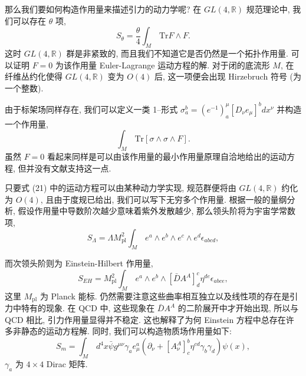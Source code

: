 \documentclass{article}
\begin{document}
那么我们要如何构造作用量来描述引力的动力学呢? 在 $GL(4,\mathbb{R})$ 规范理论中, 我们可以存在 $\theta$ 项,
\begin{equation}
S_{\theta}=\frac{\theta}{4}\int_{M}\,\text{Tr} F\wedge F.
\end{equation}
这时 $GL(4, \mathbb{R})$ 群是非紧致的, 而且我们不知道它是否仍然是一个拓扑作用量. 可以证明 $F=0$ 为该作用量 Euler-Lagrange 运动方程的解. 对于闭的底流形 $M$, 在纤维丛约化使得  $GL(4, \mathbb{R})$ 变为  $O(4)$ 后, 这一项便会出现 Hirzebruch 符号 (为一个整数).

由于标架场同样存在, 我们可以定义一类 1--形式 $\sigma_{a}^{b}=(e^{-1})_{a}^{\mu}[D_{\nu}e_{\mu}]^{b}dx^{\nu}$ 并构造一个作用量,
\begin{equation}
\int_{M}\,\textrm{Tr}[\sigma\wedge\sigma\wedge F].
\end{equation}
虽然 $F=0$ 看起来同样是可以由该作用量的最小作用量原理自洽地给出的运动方程, 但并没有文献支持这一点.

只要式 (21) 中的运动方程可以由某种动力学实现, 规范群便将由 $GL(4, \mathbb{R})$ 约化为 $O(4)$, 且由于度规已给出, 我们可以写下无穷多个作用量. 根据一般的量纲分析, 假设作用量中导数阶次越少意味着紫外发散越少, 那么领头阶将为宇宙学常数项,
\begin{equation}
S_{\Lambda}=\Lambda M^{2}_{\textrm{pl}}\int_{M}\,e^{a}\wedge e^{b} \wedge e^{c} \wedge e^{d} \epsilon_{abcd},
\end{equation}

而次领头阶则为 Einstein-Hilbert 作用量,
\begin{equation}
S_{EH}=M^{2}_{\textrm{pl}}\int_{M}\,e^{a}\wedge e^{b} \wedge [\bar{D}A^{A}]_{d}^{c} \eta^{de}\epsilon_{abce},
\end{equation}
这里 $M_{\textrm{pl}}$ 为 Planck 能标. 仍然需要注意这些曲率相互独立以及线性项的存在是引力中特有的现象. 在 QCD 中, 这些现象在 $\bar{D}A^{A}$ 的二阶展开中才开始出现, 所以与 QCD 相比, 引力作用量显得并不稳定. 这也解释了为何 Einstein 方程中总存在许多非静态的运动方程解. 同时, 我们可以构造物质场作用量如下:
\begin{equation}
S_{m}=\int_{M}\,d^{4}x\bar{\psi}g^{\mu\nu}\gamma_{a}e^{a}_{\mu}(\partial_{\nu}+[A_{\nu}^{A}]^{b}_{c}\eta^{cd}\gamma_{b}\gamma_{d})\psi(x),
\end{equation}
$\gamma_{a}$ 为 $4\times 4$ Dirac 矩阵.
\end{document}
